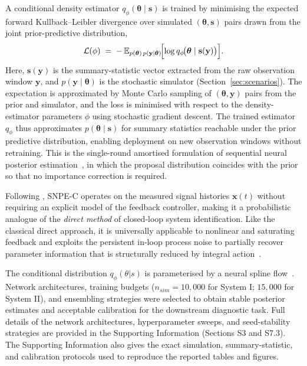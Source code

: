 \documentclass[aps,pre,twocolumn,superscriptaddress,floatfix]{revtex4-2}
\begin{document}
A conditional density estimator $q_\phi(\boldsymbol{\theta}\mid\mathbf{s})$ is trained by minimising the expected forward Kullback--Leibler divergence over simulated $(\boldsymbol{\theta},\mathbf{s})$ pairs drawn from the joint prior-predictive distribution,
%
\begin{equation}
  \mathcal{L}(\phi)
  \;=\;
  -\,\mathbb{E}_{p(\boldsymbol{\theta})\,p(\mathbf{y}\mid\boldsymbol{\theta})}
  \!\Bigl[
    \log q_\phi\!\bigl(\boldsymbol{\theta}\mid\mathbf{s}(\mathbf{y})\bigr)
  \Bigr].
  \label{eq:snpe_loss}
\end{equation}
%
Here, $\mathbf{s}(\mathbf{y})$ is the summary-statistic vector extracted from the raw observation window $\mathbf{y}$, and $p(\mathbf{y}\mid\boldsymbol{\theta})$ 
is the stochastic simulator (Section~\ref{sec:scenarios}). The expectation is 
approximated by Monte Carlo sampling of $(\boldsymbol{\theta},\mathbf{y})$ pairs 
from the prior and simulator, and the loss is minimised with respect to the density-
estimator parameters $\phi$ using stochastic gradient descent. 
The trained estimator $q_\phi$ thus approximates $p(\boldsymbol{\theta}\mid\mathbf{s})$ for summary statistics reachable under the prior predictive distribution, enabling deployment on new observation windows without retraining.
This is the single-round amortised formulation of sequential neural posterior estimation~\citep[SNPE-C;][]{Greenberg2019}, in which the proposal distribution coincides with the prior so that no importance correction is required.  

Following \citet{Forssell1999}, SNPE-C operates on the measured signal histories $\mathbf{x}(t)$ without requiring an explicit model of the feedback controller, making it a probabilistic analogue of the \emph{direct method} of closed-loop system identification. Like the classical direct approach, it is universally applicable to nonlinear and
saturating feedback and exploits the persistent in-loop process noise to partially recover parameter information that is structurally reduced by integral action~\citep{Ljung1999}.

The conditional distribution $q_\phi(\theta\vert{}s)$ is parameterised by a neural spline flow~\citep{Durkan2019}. 
Network architectures, training budgets ($n_{sim} = 10,000$ for System I; $15,000$
for System II), and ensembling strategies were selected to obtain stable posterior 
estimates and acceptable calibration for the downstream diagnostic task.
Full details of the network architectures, hyperparameter sweeps, and seed-stability strategies are 
provided in the Supporting Information (Sections S3 and S7.3). The Supporting Information also gives the exact simulation, summary-statistic, and calibration protocols used to reproduce the reported tables and figures.
\end{document}
